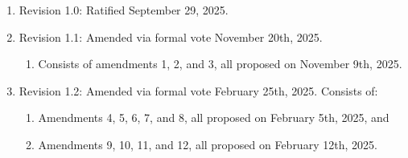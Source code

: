 \documentclass[11pt]{article}
\newcounter{h1}
\newcounter{h2}[h1]
\newcounter{h3}[h2]
\begin{document}

\begin{enumerate}
  \item Revision 1.0: Ratified September 29, 2025.
  \item Revision 1.1: Amended via formal vote November 20th, 2025.
  \begin{enumerate}
    \item Consists of amendments 1, 2, and 3, all proposed on November 9th, 2025.
  \end{enumerate}
  \item Revision 1.2: Amended via formal vote February 25th, 2025. Consists of:
  \begin{enumerate}
    \item Amendments 4, 5, 6, 7, and 8, all proposed on February 5th, 2025, and
    \item Amendments 9, 10, 11, and 12, all proposed on February 12th, 2025.
  \end{enumerate}
\end{enumerate}
\end{document}
